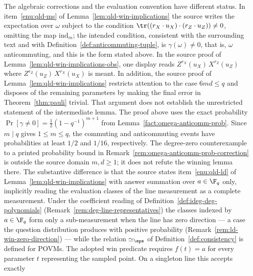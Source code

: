 \begin{remark}
	\label{rem:qld-win-implications-typos}
	The algebraic corrections and the evaluation convention have different
	status. In
	item~\ref{enu:qld-ms} of Lemma~\ref{lem:qld-win-implications} the
	source writes the expectation over $\omega$ subject to the condition
	$\tr((r_X \cdot u_X) \cdot (r_Z \cdot u_Z)) \neq 0$, omitting the map
	$\mathrm{ind}_m$; the intended condition, consistent with the
	surrounding text and with Definition~\ref{def:anticommuting-tuple}, is
	$\gamma(\omega) \neq 0$, that is, $\omega$ anticommuting, and this is
	the form stated above. In the source proof of
	Lemma~\ref{lem:qld-win-implications-obs}, one display reads
	$Z^{r_X}(u_X)\,X^{r_Z}(u_Z)$ where $Z^{r_Z}(u_Z)\,X^{r_X}(u_X)$ is
	meant.
	In addition, the source proof of Lemma~\ref{lem:qld-win-implications}
	restricts attention to the case $6md \leq q$ and disposes of the
	remaining parameters by making the final error in
	Theorem~\ref{thm:pauli} trivial. That argument does not establish the
	unrestricted statement of the intermediate lemma. The proof above uses
	the exact probability
	$\Pr[\gamma\ne0]=\frac12(1-q^{-1})^{m+1}$ from
	Lemma~\ref{fact:omega-anticomm-prob}. Since $m\mid q$ gives
	$1\leq m\leq q$, the commuting and anticommuting events have probabilities
	at least $1/2$ and $1/16$, respectively. The degree-zero counterexample
	to a printed probability bound in
	Remark~\ref{rem:omega-anticomm-prob-correction} is outside the source
	domain $m,d\geq1$; it does not refute the winning lemma there.
	The substantive difference is that the source states item~\ref{enu:qld-ld} of
	Lemma~\ref{lem:qld-win-implications} with answer summation over
	$a \in \F_q$ only, implicitly reading the evaluation classes of the
	line measurement as a complete measurement. Under the coefficient
	reading of Definition~\ref{def:ideg-deg-polynomials}
	(Remark~\ref{rem:deg-line-representatives}) the classes indexed by
	$a \in \F_q$ form only a sub-measurement when the line has zero
	direction --- a case the question distribution produces with positive
	probability (Remark~\ref{rem:ld-win-zero-direction}) --- while the
	relation $\simeq_\eps$ of Definition~\ref{def:consistency} is defined
	for POVMs. The adopted win predicate requires $f(t)=a$ for every parameter
	$t$ representing the sampled point. On a singleton line this accepts exactly

\end{remark}
